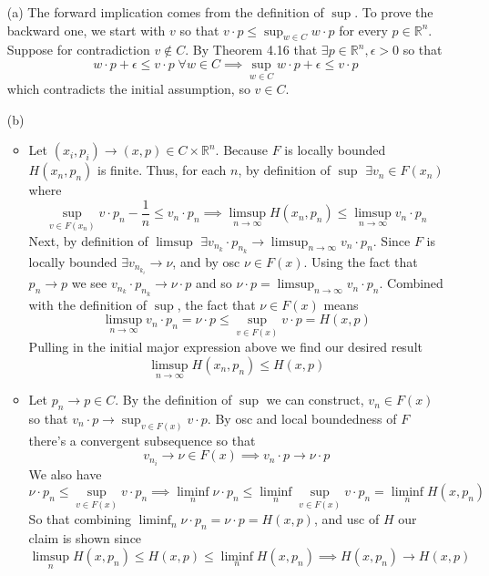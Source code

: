 \documentclass{article}
\newenvironment{ex}[1]
  {\renewcommand\theexercise{#1}\exercise}
  {\endexercise}
\newcommand{\R}[1]{\mathbb{R}^{#1}}
\newcommand{\idot}[2]{#1 \cdot #2}
\begin{document}
\begin{ex}{5.4} %
  \begin{enumerate}
    \item[(a)]
      The forward implication comes from the definition of $\sup$. To prove the backward one, we start with $v$ so that $\idot{v}{p} \le \sup_{w \in C} \idot{w}{p}$ for every $p \in \R{n}$. Suppose for contradiction $v \not\in C$. By Theorem 4.16 that $\exists p \in \R{n}, \epsilon > 0$ so that
      $$
      \idot{w}{p} + \epsilon \le \idot{v}{p} \; \forall w \in C \implies \sup_{w\in C} \idot{w}{p} + \epsilon \le \idot{v}{p}
      $$
      which contradicts the initial assumption, so $v \in C$.
    \item[(b)]
      \begin{itemize}
        \item
          Let $(x_i, p_i) \to (x, p) \in C \times \R{n}$. Because $F$ is locally bounded $H(x_n, p_n)$ is finite. Thus, for each $n$, by definition of $\sup$ $\exists v_n \in F(x_n)$ where
          $$
          \sup_{v \in F(x_n)} \idot{v}{p_n} - \frac{1}{n} \le \idot{v_n}{p_n} \implies \limsup_{n \to \infty} H(x_n, p_n) \le \limsup_{n \to \infty} \idot{v_n}{p_n}
          $$
          Next, by definition of $\limsup$ $\exists \idot{v_{n_k}}{p_{n_k}} \to \limsup_{n \to \infty} \idot{v_n}{p_n}$. Since $F$ is locally bounded $\exists v_{n_{k_i}} \to \nu$, and by osc $\nu \in F(x)$. Using the fact that $p_n \to p$ we see $\idot{v_{n_k}}{p_{n_k}} \to \idot{\nu}{p}$ and so $\idot{\nu}{p} = \limsup_{n \to \infty} \idot{v_n}{p_n}$. Combined with the definition of $\sup$, the fact that $\nu \in F(x)$ means
          $$
          \limsup_{n \to \infty} \idot{v_n}{p_n} = \idot{\nu}{p} \le \sup_{v \in F(x)} \idot{v}{p} = H(x, p)
          $$
          Pulling in the initial major expression above we find our desired result
          $$
          \limsup_{n \to \infty} H(x_n, p_n) \le H(x, p)
          $$
        \item
          Let $p_n \to p \in C$. By the definition of $\sup$ we can construct, $v_n \in F(x)$ so that $\idot{v_n}{p} \to \sup_{v \in F(x)} \idot{v}{p}$. By osc and local boundedness of $F$ there's a convergent subsequence so that
          $$
          v_{n_i} \to \nu \in F(x) \implies \idot{v_n}{p} \to \idot{\nu}{p}
          $$
          We also have
          $$
          \idot{\nu}{p_n} \le \sup_{v \in F(x)} \idot{v}{p_n} \implies \liminf_n \idot{\nu}{p_n} \le \liminf_n \sup_{v \in F(x)} \idot{v}{p_n} = \liminf_n H(x, p_n)
          $$
          So that combining $\liminf_n \idot{\nu}{p_n} = \idot{\nu}{p} = H(x, p)$, and usc of $H$ our claim is shown since
          $$
          \limsup_n H(x, p_n) \le H(x, p) \le \liminf_n H(x, p_n) \implies H(x, p_n) \to H(x, p)
          $$
      \end{itemize}
  \end{enumerate}
\end{ex} %
\end{document}
